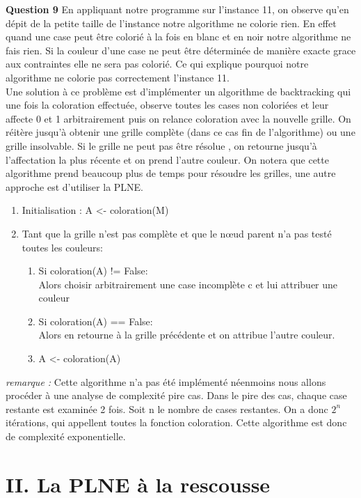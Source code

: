 \documentclass[a4paper]{memoir}
\begin{document}
\textbf{Question 9} En appliquant notre programme sur l'instance 11, on observe qu'en dépit de la petite taille de l'instance notre algorithme ne colorie rien. En effet quand une case peut être colorié à la fois en blanc et en noir notre algorithme ne fais rien. Si la couleur d'une case ne peut être déterminée de manière exacte grace aux contraintes elle ne sera pas colorié. Ce qui explique pourquoi notre algorithme ne colorie pas correctement l'instance 11.
\\
Une solution à ce problème est d'implémenter un algorithme de backtracking qui une fois la coloration effectuée, observe toutes les cases non coloriées et leur affecte 0 et 1 arbitrairement puis on relance coloration avec la nouvelle grille. On réitère jusqu'à obtenir une grille complète (dans ce cas fin de l'algorithme) ou une grille insolvable. Si le grille ne peut pas être résolue , on retourne jusqu'à l'affectation la plus récente et on prend l'autre couleur. On notera que cette algorithme prend beaucoup plus de temps pour résoudre les grilles, une autre approche est d'utiliser la PLNE.\\
\begin{enumerate}
\item Initialisation : A <- coloration(M) 
\item Tant que la grille n'est pas complète et que le nœud parent n'a pas testé toutes les couleurs:
  \begin{enumerate}
    \item Si coloration(A) != False:\\
      Alors choisir arbitrairement une case incomplète c et lui attribuer une couleur
    \item Si coloration(A) == False:\\
      Alors en retourne à la grille précédente et on attribue l'autre couleur.
    \item  A <- coloration(A)
  \end{enumerate}
\end{enumerate}
\textit{remarque : } Cette algorithme n'a pas été implémenté néenmoins nous allons procéder à une analyse de complexité pire cas. Dans le pire des cas, chaque case restante est examinée 2 fois. Soit n le nombre de cases restantes. On a donc $2^n $ itérations, qui appellent toutes la fonction coloration. Cette algorithme est donc de complexité exponentielle.



 	
 	\newpage
 	\section{II. La PLNE à la rescousse}
\end{document}
